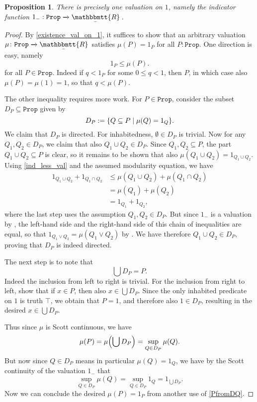 \documentclass[reqno,11pt]{amsproc}
\theoremstyle{plain}
\newtheorem{proposition}[theorem]{Proposition}
\theoremstyle{definition}
\newcommand{\Const}[1]{\mathtt{#1}}
\renewcommand{\to}[1][]{\xrightarrow{#1}}
\newcommand{\ubar}[1]{\underaccent{\bar}{#1}}
\newcommand{\ind}[1]{1_{#1}}			%
\newcommand{\inc}{\ind{-}}			%
\newcommand{\internal}[1]{\raisebox{-.03ex}{$\mathbbmtt{#1}$}}
\newcommand{\hs}{\hspace{1pt}}
\newcommand{\trr}{\internal{R}}
\newcommand{\tlrr}{\ubar{\trr}\hs}
\newcommand{\prop}{\Const{Prop}}
\let\originalleft\left
\let\originalright\right
\renewcommand{\left}{\mathopen{}\mathclose\bgroup\originalleft}
\renewcommand{\right}{\aftergroup\egroup\originalright}
\numberwithin{equation}{section}
\begin{document}
\begin{proposition}
	\label{uniqueness_val_on_1}
	There is precisely one valuation on $1$, namely the indicator function $\inc : \prop \to \tlrr$.
\end{proposition}

\begin{proof}
	By \cref{existence_val_on_1}, it suffices to show that an arbitrary valuation $\mu \colon \prop \to \tlrr$ satisfies $\mu(P) = \ind{P}$ for all $P : \prop$. One direction is easy, namely
	\begin{equation}
		\label{ind_less_val}
		\ind{P} \le \mu(P).
	\end{equation}
	for all $P \in \prop$. Indeed if $q < \ind{P}$ for some $0 \le q < 1$, then $P$, in which case also $\mu(P) = \mu(1) = 1$, so that $q < \mu(P)$.
	
	The other inequality requires more work. For $P \in \prop$, consider the subset $D_P \subseteq \prop$ given by
	\[
		D_P := \left\{ Q \subseteq P \mid \mu(Q) = 1_Q \right\}.
	\]
	We claim that $D_P$ is directed. For inhabitedness, $\emptyset \in D_P$ is trivial. Now for any $Q_1, Q_2 \in D_P$, we claim that also $Q_1 \cup Q_2 \in D_P$. Since $Q_1, Q_2 \subseteq P$, the part $Q_1 \cup Q_2 \subseteq P$ is clear, so it remains to be shown that also $\mu(Q_1 \cup Q_2) = \ind{Q_1 \cup Q_2}$. Using \eqref{ind_less_val} and the assumed modularity equation, we have
	\begin{align*}
		\ind{Q_1 \cup Q_2} + \ind{Q_1 \cap Q_2}		& \le \mu(Q_1 \cup Q_2) + \mu(Q_1 \cap Q_2)	\\
								& = \mu(Q_1) + \mu(Q_2) \\
								& = \ind{Q_1} + \ind{Q_2},
	\end{align*}
	where the last step uses the assumption $Q_1, Q_2 \in D_P$. But since $\inc$ is a valuation by , the left-hand side and the right-hand side of this chain of inequalities are equal, so that $\ind{Q_1 \lor Q_2} = \mu(Q_1 \lor Q_2)$ by . We have therefore $Q_1 \cup Q_2 \in D_P$, proving that $D_P$ is indeed directed.

	The next step is to note that
	\begin{equation}
		\label{PfromDQ}
		\bigcup D_P = P.
	\end{equation}
	Indeed the inclusion from left to right is trivial. For the inclusion from right to left, show that if $x \in P$, then also $x \in \bigcup D_P$. Since the only inhabited predicate on $1$ is truth $\top$, we obtain that $P = 1$, and therefore also $1 \in D_P$, resulting in the desired $x \in \bigcup D_P$.

	Thus since $\mu$ is Scott continuous, we have
	\[
		\mu(P) = \mu \left( \bigcup D_P \right) = \sup_{Q \in D_P} \mu(Q).
	\]
	But now since $Q \in D_P$ means in particular $\mu(Q) = \ind{Q}$, we have by the Scott continuity of the valuation $\inc$ that
	\[
		\sup_{Q \in D_P} \mu(Q) = \sup_{Q \in D_P} \ind{Q} = \ind{\bigcup D_P}.
	\]
	Now we can conclude the desired $\mu(P) = \ind{P}$ from another use of \eqref{PfromDQ}.
\end{proof}
\end{document}
